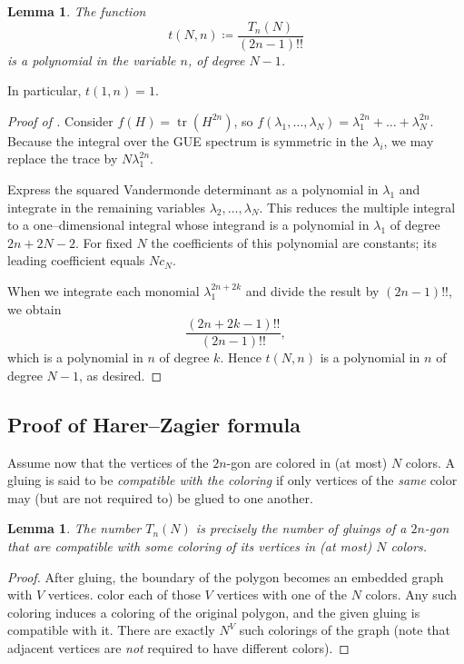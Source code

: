 \documentclass[letterpaper,11pt,oneside,reqno]{book}
\numberwithin{equation}{chapter}  %
\newtheorem{lemma}[proposition]{Lemma}
\theoremstyle{definition}
\begin{document}
\begin{lemma}
	\label{lecture15:lem:traces-polynomial}
	The function
\[
  t(N,n)\coloneqq\frac{T_n(N)}{(2n-1)!!}
\]
is a polynomial in the variable \(n\), of degree \(N-1\).
\end{lemma}
In particular,
$t(1,n)=1$.
\begin{proof}[Proof of ]
Consider $f(H)=\operatorname{tr}(H^{2n})$,
so $f(\lambda_1,\ldots,\lambda_N )=\lambda_1^{2n}+\ldots+\lambda_N^{2n}$.
Because
the integral over the GUE spectrum
is symmetric in the \(\lambda_i\), we may replace the trace
by \(N\lambda_1^{2n}\).

Express the squared Vandermonde determinant as a polynomial in
\(\lambda_1\) and integrate in the remaining variables
\(\lambda_2,\dots,\lambda_N\).  This reduces the multiple integral to a
one–dimensional integral whose integrand is a polynomial in
\(\lambda_1\) of degree \(2n+2N-2\).  For fixed \(N\) the coefficients
of this polynomial are constants; its leading coefficient equals
\(Nc_N\).

When we integrate each monomial \(\lambda_1^{2n+2k}\) and divide the
result by \((2n-1)!!\), we obtain
\[
  \frac{(2n+2k-1)!!}{(2n-1)!!},
\]
which is a polynomial in \(n\) of degree \(k\).  Hence \(t(N,n)\) is a
polynomial in \(n\) of degree \(N-1\), as desired.
\end{proof}

\subsection{Proof of Harer–Zagier formula}


Assume now that the vertices of the $2n$-gon are colored in (at most)
$N$ colors.  A gluing is said to be \emph{compatible with the coloring}
if only vertices of the \emph{same} color may
(but are not required to)
be
glued to one another.

\begin{lemma}
The number $T_n(N)$ is precisely the number of gluings of a
$2n$-gon that are compatible with some coloring of its vertices in
(at most) $N$ colors.
\end{lemma}

\begin{proof}
After gluing, the boundary of the polygon becomes an embedded graph with
$V$ vertices.  color each of those $V$ vertices with one of the $N$
colors.  Any such coloring induces a coloring of the original
polygon, and the given gluing is compatible with it.  There are exactly
$N^{V}$ such colorings of the graph (note that adjacent vertices are
\emph{not} required to have different colors).
\end{proof}
\end{document}
